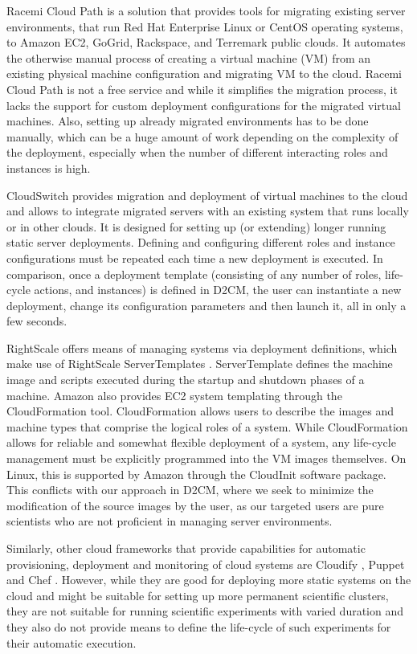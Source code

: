 \documentclass[a4paper,10pt]{article}
\begin{document}
Racemi Cloud Path \cite{racemi} is a solution that provides tools for migrating existing server environments, that run Red Hat Enterprise Linux or CentOS operating systems, to Amazon EC2, GoGrid, Rackspace, and Terremark public clouds. It automates the otherwise manual process of creating a virtual machine (VM) from an existing physical machine configuration and migrating VM to the cloud. Racemi Cloud Path is not a free service and while it simplifies the migration process, it lacks the support for custom deployment configurations for the migrated virtual machines. Also, setting up already migrated environments has to be done manually, which can be a huge amount of work depending on the complexity of the deployment, especially when the number of different interacting roles and instances is high.   

CloudSwitch \cite{cloudswitch} provides migration and deployment of virtual machines to the cloud and allows to integrate migrated servers with an existing system that runs locally or in other clouds. 
It is designed for setting up (or extending) longer running static server deployments. Defining and configuring different roles and instance configurations must be repeated each time a new deployment is executed. 
In comparison, once a deployment template (consisting of any number of roles, life-cycle actions, and instances) is defined in D2CM, the user can instantiate a new deployment, change its configuration parameters and then launch it, all in only a few seconds. 


RightScale offers means of managing systems via deployment definitions, which make use of RightScale ServerTemplates \cite{rightscale:servertemplate}. ServerTemplate defines the machine image and scripts executed during the startup and shutdown phases of a machine. Amazon also provides EC2 system templating through the CloudFormation \cite{amazon:cloudformation} tool. CloudFormation allows users to describe the images and machine types that comprise the logical roles of a system. While CloudFormation allows for reliable and somewhat flexible deployment of a system, any life-cycle management must be explicitly programmed into the VM images themselves. On Linux, this is supported by Amazon through the CloudInit software package. This conflicts with our approach in D2CM, where we seek to minimize the modification of the source images by the user, as our targeted users are pure scientists who are not proficient in managing server environments. 

Similarly, other cloud frameworks that provide capabilities for automatic provisioning, deployment and monitoring of cloud systems are Cloudify \cite{cloudify}, Puppet \cite{puppet} and Chef \cite{chef}. However, while they are good for deploying more static systems on the cloud and might be suitable for setting up more permanent scientific clusters, they are not suitable for running scientific experiments with varied duration and they also do not provide means to define the life-cycle of such experiments for their automatic execution.    
\end{document}
